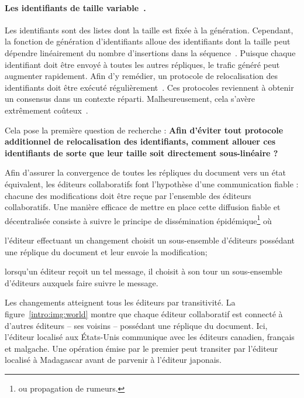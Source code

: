 \paragraph{Les identifiants de taille variable~\cite{weiss2009logoot}.} Les
identifiants sont des listes dont la taille est fixée à la
génération. Cependant, la fonction de génération d'identifiants alloue des
identifiants dont la taille peut dépendre linéairement du nombre d'insertions
dans la séquence~\cite{weiss2009logoot}.
Puisque chaque identifiant doit être envoyé à toutes les autres répliques, le
trafic généré peut augmenter rapidement.  Afin d'y remédier, un protocole de
relocalisation des identifiants doit être exécuté
régulièrement~\cite{zawirskiasynchronous}. Ces protocoles reviennent à obtenir
un consensus dans un contexte réparti. Malheureusement, cela s'avère extrêmement
coûteux~\cite{mostefaoui2015signature}.

Cela pose la première question de recherche : \textbf{Afin d'éviter tout
  protocole additionnel de relocalisation des identifiants, comment allouer ces
  identifiants de sorte que leur taille soit directement sous-linéaire ?}

Afin d'assurer la convergence de toutes les répliques du document vers un état
équivalent, les éditeurs collaboratifs font l'hypothèse d'une communication
fiable : chacune des modifications doit être reçue par l'ensemble des éditeurs
collaboratifs.
Une manière efficace de mettre en place cette diffusion fiable et décentralisée
consiste à suivre le principe de dissémination épidémique\footnote{ou propagation
  de rumeurs.}  où
\begin{inparaenum}[(i)]
\item l'éditeur effectuant un changement choisit un sous-ensemble d'éditeurs
  possédant une réplique du document et leur envoie la modification;
\item lorsqu'un éditeur reçoit un tel message, il choisit à son tour un
  sous-ensemble d'éditeurs auxquels faire suivre le message.
\end{inparaenum}
Les changements atteignent tous les éditeurs par transitivité.
La figure~\ref{intro:img:world} montre que chaque éditeur collaboratif est
connecté à d'autres éditeurs -- ses voisins -- possédant une réplique du
document. Ici, l'éditeur localisé aux États-Unis communique avec les éditeurs
canadien, français et malgache.
Une opération émise par le premier peut transiter par l'éditeur localisé à
Madagascar avant de parvenir à l'éditeur japonais. 

